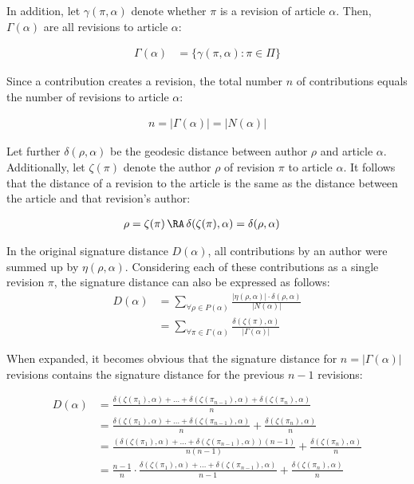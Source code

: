 In addition, let $\gamma(\pi,\alpha)$ denote whether $\pi$ is a revision of article $\alpha$.
Then, $\Gamma(\alpha)$ are all revisions to article $\alpha$:

\begin{align*}
\Gamma(\alpha) &= \{\gamma(\pi,\alpha) : \pi \in \Pi\}
\end{align*}

Since a contribution creates a revision, the total number $n$ of contributions equals the number of revisions to article $\alpha$:

\begin{align*}
 n = |\Gamma(\alpha)| = |N(\alpha)|
\end{align*}

Let further $\delta(\rho,\alpha)$ be the geodesic distance between author $\rho$ and article $\alpha$.
Additionally, let $\zeta(\pi)$ denote  the author $\rho$ of revision $\pi$ to article $\alpha$.
It follows that the distance of a revision to the article is the same as the distance between the article and that revision's author:

\begin{align*}
\rho &= \zeta(\pi) \, \RA \,   \delta(\zeta(\pi),\alpha) = \delta(\rho,\alpha) 
\end{align*}

In the original signature distance $D(\alpha)$, all contributions by an author were summed up by $\eta(\rho,\alpha)$.
Considering each of these contributions as a single revision $\pi$, the signature distance can also be  expressed as follows:
\begin{align*}
D(\alpha) &= \sum_{\forall \rho \in P(\alpha)} \frac{|\eta(\rho,\alpha)| \cdot \delta(\rho,\alpha)}{|N(\alpha)|} \\
 &=  \sum_{\forall \pi \in \Gamma(\alpha)} \frac{\delta(\zeta(\pi),\alpha)}{|\Gamma(\alpha)|}
 \end{align*}

When expanded, it becomes obvious that the signature distance for $n = |\Gamma(\alpha)|$ revisions contains the signature distance for the previous $n-1$ revisions:
 
\begin{align*}
D(\alpha) &=  \frac{\delta(\zeta(\pi_{1}),\alpha)  + \ldots + \delta(\zeta(\pi_{n-1}),\alpha) + \delta(\zeta(\pi_{n}),\alpha)}{n} \\
 &=  \frac{\delta(\zeta(\pi_{1}),\alpha)  + \ldots + \delta(\zeta(\pi_{n-1}),\alpha)}{n} + \frac{\delta(\zeta(\pi_{n}),\alpha)}{n} \\
 &=  \frac{(\delta(\zeta(\pi_{1}),\alpha)  + \ldots + \delta(\zeta(\pi_{n-1}),\alpha))(n-1)}{n(n-1)} + \frac{\delta(\zeta(\pi_{n}),\alpha)}{n} \\
 &=  \frac{n-1}{n} \cdot \frac{\delta(\zeta(\pi_{1}),\alpha)  + \ldots + \delta(\zeta(\pi_{n-1}),\alpha)}{n-1} + \frac{\delta(\zeta(\pi_{n}),\alpha)}{n} 
\end{align*}


